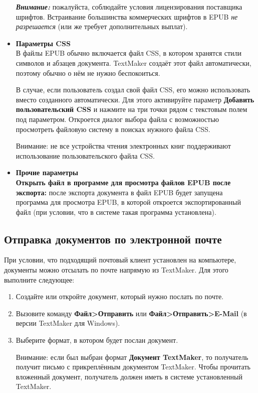 ﻿\documentclass[a4paper,10pt]{article}
\begin{document}
\begin{itemize}
\begin{mdframed}[backgroundcolor=blue!10]
\textbf{\textit{Внимание:}} пожалуйста, соблюдайте условия лицензирования поставщика шрифтов. Встраивание большинства коммерческих шрифтов в EPUB \textit{не разрешается} (или же требует дополнительных выплат).
\end{mdframed}
\item \textbf{Параметры CSS}\\
В файлы EPUB обычно включается файл CSS, в котором хранятся стили символов и абзацев документа. TextMaker создаёт этот файл автоматически, поэтому обычно о нём не нужно беспокоиться.

В случае, если пользователь создал свой файл CSS, его можно использовать вместо созданного автоматически. Для этого активируйте параметр \textbf{Добавить пользовательский CSS} и нажмите на три точки рядом с текстовым полем под параметром. Откроется диалог выбора файла с возможностью просмотреть файловую систему в поисках нужного файла CSS.

Внимание: не все устройства чтения электронных книг поддерживают использование пользовательского файла CSS.
\item \textbf{Прочие параметры}\\
\textbf{Открыть файл в программе для просмотра файлов EPUB после экспорта:} после экспорта документа в файл EPUB будет запущена программа для просмотра EPUB, в которой откроется экспортированный файл (при условии, что в системе такая программа установлена).
\end{itemize}

\subsection{Отправка документов по электронной почте}
При условии, что подходящий почтовый клиент установлен на компьютере, документы можно отсылать по почте напрямую из TextMaker. Для этого выполните следующее:
\begin{enumerate}
 \item Создайте или откройте документ, который нужно послать по почте.
 \item Вызовите команду \textbf{Файл>Отправить} или \textbf{Файл>Отправить>E-Mail} (в версии TextMaker для Windows).
 \item Выберите формат, в котором будет послан документ.
 
 {\footnotesize Внимание: если был выбран формат \textbf{Документ TextMaker}, то получатель получит письмо с прикреплённым документом TextMaker. Чтобы прочитать вложенный документ, получатель должен иметь в системе установленный TextMaker.}
\end{enumerate}
\end{document}
